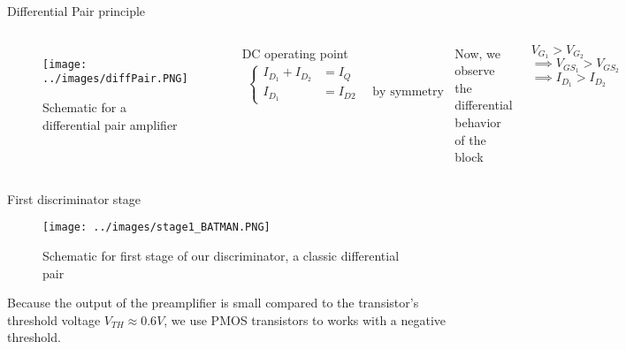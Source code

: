 \documentclass[aspectratio=169,xcolor=dvipsnames]{beamer}
\begin{document}
	\begin{frame}{Differential Pair principle}
		\begin{columns}[c] %
			
			\begin{figure}[h!]
				\centering
				\texttt{[image: ../images/diffPair.PNG]}
				\label{diffPair}
				\caption{Schematic for a differential pair amplifier}
			\end{figure}
			
			DC operating point
			\begin{align}
				\begin{cases}
					I_{D_1} + I_{D_2} &= I_Q \\
					I_{D_1} &= I_{D2} \quad \text{ by symmetry}
				\end{cases}
			\end{align}
			
			Now, we observe the differential behavior of the block 
			
			$V_{G_1} > V_{G_2}$
			\\ $\implies V_{GS_1} > V_{GS_2}$
			\\$\implies I_{D_1} > I_{D_2}$
		\end{columns}
	\end{frame}
	
	\begin{frame}{First discriminator stage}
		\begin{figure}[h!]
			\centering
			\texttt{[image: ../images/stage1\_BATMAN.PNG]}
			\label{diffPairBATMAN}
			\caption{Schematic for first stage of our discriminator, a classic differential pair}
		\end{figure}
		\begin{block}{}
			Because the output of the preamplifier is small compared to the transistor's threshold voltage $V_{TH} \approx 0.6V$, we use PMOS transistors to works with a negative threshold.
		\end{block}
	\end{frame}
	
\end{document}
